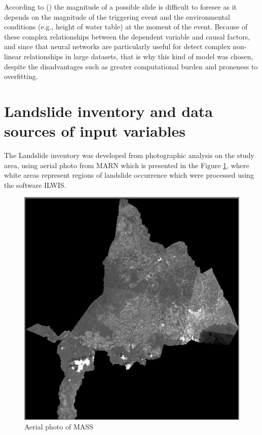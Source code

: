 \documentclass[11pt,twoside]{rmta2010esp}%
\begin{document}
According to (\cite{van2006landslide}) the magnitude of a possible
slide is difficult to foresee as it depends on the magnitude of the triggering event and the environmental conditions (e.g., height of water table) at the moment of the event. Because of these complex relationships between the dependent variable and causal factors, and since that neural networks are particularly useful for detect complex non-linear relationships in large datasets, that is why this kind of model was chosen, despite the disadvantages such as greater computational burden and proneness to overfitting.  





\section{Landslide inventory and data sources of input variables}
\label{sec:landsinvet}
The Landslide inventory was developed from photographic analysis on the study area, using 
aerial photo from MARN which is presented in the Figure \ref{fig:img01}, where white areas represent regions of landslide occurrence which were processed using the software ILWIS. 

 \begin{center}
  \begin{figure}[H]
   \centering
   \includegraphics[scale=0.40]{img01}
   \caption{\small{Aerial photo of MASS}}
   \label{fig:img01}
  \end{figure}
 \end{center}
\end{document}

